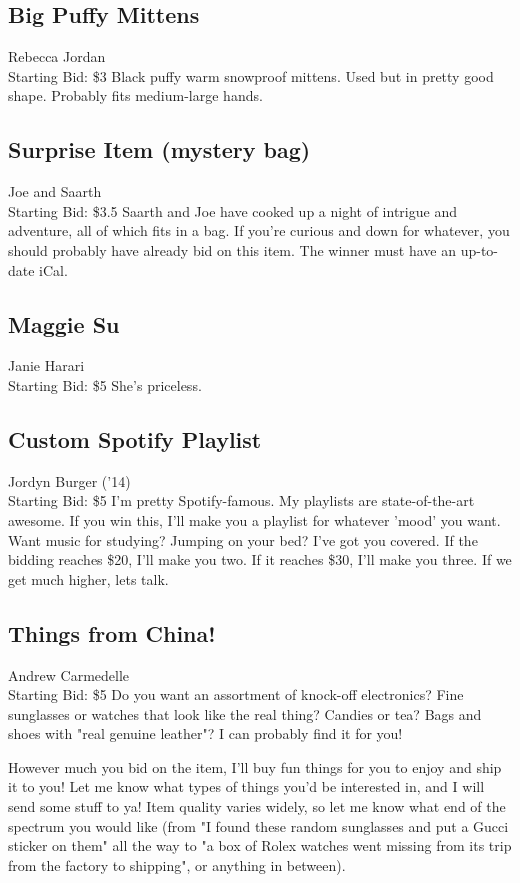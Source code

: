 \documentclass[11pt]{article}
\begin{document}
\subsection{Big Puffy Mittens}
Rebecca Jordan
\\
Starting Bid: \$3
\newline
Black puffy warm snowproof mittens. Used but in pretty good shape. Probably fits medium-large hands.
\subsection{Surprise Item (mystery bag)}
Joe and Saarth
\\
Starting Bid: \$3.5
\newline
Saarth and Joe have cooked up a night of intrigue and adventure, all of which fits in a bag. If you're curious and down for whatever, you should probably have already bid on this item. The winner must have an up-to-date iCal.
\subsection{Maggie Su}
Janie Harari
\\
Starting Bid: \$5
\newline
She's priceless.
\subsection{Custom Spotify Playlist}
Jordyn Burger ('14)
\\
Starting Bid: \$5
\newline
I'm pretty Spotify-famous. My playlists are state-of-the-art awesome. If you win this, I'll make you a playlist for whatever 'mood' you want. Want music for studying? Jumping on your bed? I've got you covered. If the bidding reaches \$20, I'll make you two. If it reaches \$30, I'll make you three. If we get much higher, lets talk.
\subsection{Things from China!}
Andrew Carmedelle
\\
Starting Bid: \$5
\newline
Do you want an assortment of knock-off electronics? Fine sunglasses or watches that look like the real thing? Candies or tea? Bags and shoes with "real genuine leather"? I can probably find it for you!

However much you bid on the item, I'll buy fun things for you to enjoy and ship it to you! Let me know what types of things you'd be interested in, and I will send some stuff to ya! Item quality varies widely, so let me know what end of the spectrum you would like (from "I found these random sunglasses and put a Gucci sticker on them" all the way to "a box of Rolex watches went missing from its trip from the factory to shipping", or anything in between).
\end{document}
